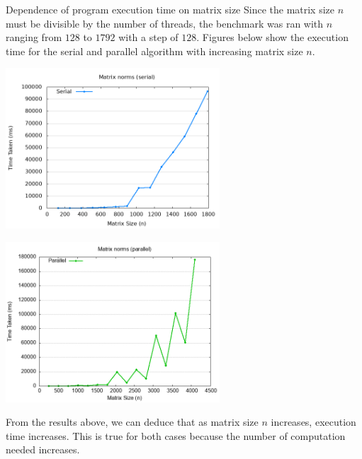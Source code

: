 \documentclass[12pt]{article}
\begin{document}
\begin{section}{Dependence of program execution time on matrix size}
 Since the matrix size $n$ must be divisible by the number of threads, the benchmark was ran with $n$ ranging from
 $128$ to $1792$ with a step of $128$. Figures below show the execution time for the serial and parallel algorithm with
 increasing matrix size $n$.

 \begin{center}
     \begin{minipage}{0.48\linewidth}
         \includegraphics*[width=8cm]{images/benchmark_serial.png}
     \end{minipage}
     \begin{minipage}{0.48\linewidth}
         \includegraphics*[width=8cm]{images/benchmark_parallel_openmp.png}
     \end{minipage}
 \end{center}

 From the results above, we can deduce that as matrix size $n$ increases, execution time increases. This is true for both cases because
 the number of computation needed increases.

\end{section}
\end{document}
